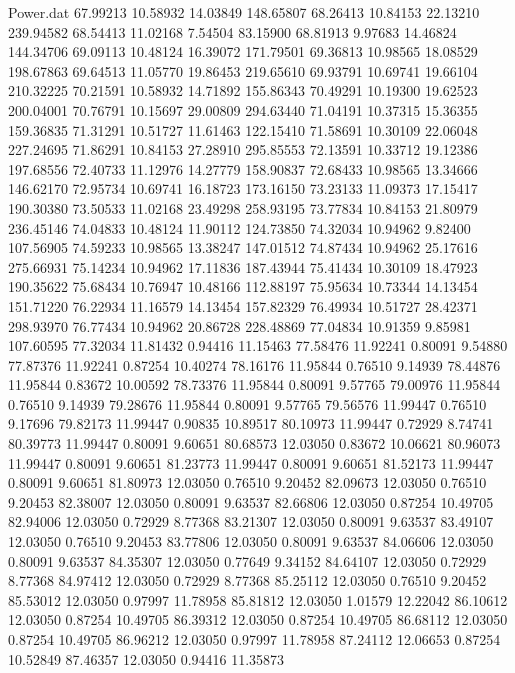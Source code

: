\begin{filecontents}{Power.dat}
  67.99213   10.58932   14.03849  148.65807
  68.26413   10.84153   22.13210  239.94582
  68.54413   11.02168    7.54504   83.15900
  68.81913    9.97683   14.46824  144.34706
  69.09113   10.48124   16.39072  171.79501
  69.36813   10.98565   18.08529  198.67863
  69.64513   11.05770   19.86453  219.65610
  69.93791   10.69741   19.66104  210.32225
  70.21591   10.58932   14.71892  155.86343
  70.49291   10.19300   19.62523  200.04001
  70.76791   10.15697   29.00809  294.63440
  71.04191   10.37315   15.36355  159.36835
  71.31291   10.51727   11.61463  122.15410
  71.58691   10.30109   22.06048  227.24695
  71.86291   10.84153   27.28910  295.85553
  72.13591   10.33712   19.12386  197.68556
  72.40733   11.12976   14.27779  158.90837
  72.68433   10.98565   13.34666  146.62170
  72.95734   10.69741   16.18723  173.16150
  73.23133   11.09373   17.15417  190.30380
  73.50533   11.02168   23.49298  258.93195
  73.77834   10.84153   21.80979  236.45146
  74.04833   10.48124   11.90112  124.73850
  74.32034   10.94962    9.82400  107.56905
  74.59233   10.98565   13.38247  147.01512
  74.87434   10.94962   25.17616  275.66931
  75.14234   10.94962   17.11836  187.43944
  75.41434   10.30109   18.47923  190.35622
  75.68434   10.76947   10.48166  112.88197
  75.95634   10.73344   14.13454  151.71220
  76.22934   11.16579   14.13454  157.82329
  76.49934   10.51727   28.42371  298.93970
  76.77434   10.94962   20.86728  228.48869
  77.04834   10.91359    9.85981  107.60595
  77.32034   11.81432    0.94416   11.15463
  77.58476   11.92241    0.80091    9.54880
  77.87376   11.92241    0.87254   10.40274
  78.16176   11.95844    0.76510    9.14939
  78.44876   11.95844    0.83672   10.00592
  78.73376   11.95844    0.80091    9.57765
  79.00976   11.95844    0.76510    9.14939
  79.28676   11.95844    0.80091    9.57765
  79.56576   11.99447    0.76510    9.17696
  79.82173   11.99447    0.90835   10.89517
  80.10973   11.99447    0.72929    8.74741
  80.39773   11.99447    0.80091    9.60651
  80.68573   12.03050    0.83672   10.06621
  80.96073   11.99447    0.80091    9.60651
  81.23773   11.99447    0.80091    9.60651
  81.52173   11.99447    0.80091    9.60651
  81.80973   12.03050    0.76510    9.20452
  82.09673   12.03050    0.76510    9.20453
  82.38007   12.03050    0.80091    9.63537
  82.66806   12.03050    0.87254   10.49705
  82.94006   12.03050    0.72929    8.77368
  83.21307   12.03050    0.80091    9.63537
  83.49107   12.03050    0.76510    9.20453
  83.77806   12.03050    0.80091    9.63537
  84.06606   12.03050    0.80091    9.63537
  84.35307   12.03050    0.77649    9.34152
  84.64107   12.03050    0.72929    8.77368
  84.97412   12.03050    0.72929    8.77368
  85.25112   12.03050    0.76510    9.20452
  85.53012   12.03050    0.97997   11.78958
  85.81812   12.03050    1.01579   12.22042
  86.10612   12.03050    0.87254   10.49705
  86.39312   12.03050    0.87254   10.49705
  86.68112   12.03050    0.87254   10.49705
  86.96212   12.03050    0.97997   11.78958
  87.24112   12.06653    0.87254   10.52849
  87.46357   12.03050    0.94416   11.35873
\end{filecontents}
